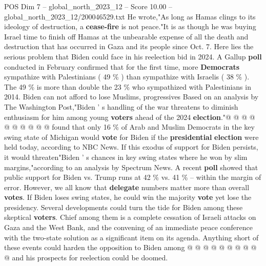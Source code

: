 \begin{textsample}{POS Dim 7 – global\_north\_2023\_12 – Score 10.00 – global\_north\_2023\_12/200046529.txt}
He wrote,"As long as Hamas clings to its ideology of destruction, a \textbf{cease-fire} is not peace."It is as though he was buying Israel time to finish off Hamas at the unbearable expense of all the death and destruction that has occurred in Gaza and its people since Oct. 7.
Here lies the serious problem that Biden could face in his reelection bid in 2024.
A Gallup \textbf{poll} conducted in February confirmed that for the first time, more \textbf{Democrats} sympathize with Palestinians ( 49 \% ) than sympathize with Israelis ( 38 \% ).
The 49 \% is more than double the 23 \% who sympathized with Palestinians in 2014.
Biden can not afford to lose Muslims, progressives Based on an analysis by The Washington Post,"Biden ' s handling of the war threatens to diminish enthusiasm for him among young \textbf{voters} ahead of the 2024 \textbf{election}."@ @ @ @ @ @ @ @ @ @ found that only 16 \% of Arab and Muslim Democrats in the key swing state of Michigan would \textbf{vote} for Biden if the \textbf{presidential} \textbf{election} were held today, according to NBC News.
If this exodus of support for Biden persists, it would threaten"Biden ' s chances in key swing states where he won by slim margins,"according to an analysis by Spectrum News.
A recent \textbf{poll} showed that public support for Biden vs.
Trump runs at 42 \% vs. 41 \% -- within the margin of error.
However, we all know that \textbf{delegate} numbers matter more than overall \textbf{votes}.
If Biden loses swing states, he could win the majority \textbf{vote} yet lose the presidency.
Several developments could turn the tide for Biden among these skeptical \textbf{voters}.
Chief among them is a complete cessation of Israeli attacks on Gaza and the West Bank, and the convening of an immediate peace conference with the two-state solution as a significant item on its agenda.
Anything short of these events could harden the opposition to Biden among @ @ @ @ @ @ @ @ @ @ and his prospects for reelection could be doomed.

\end{textsample}
